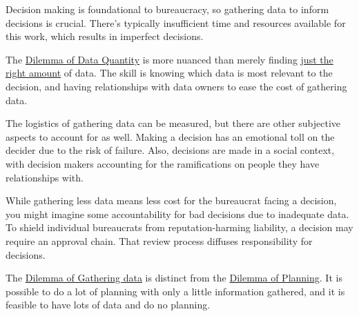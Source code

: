Decision making is foundational to bureaucracy, so gathering data to inform decisions is crucial. There's typically insufficient time and resources available for this work, which results in imperfect decisions. 

The \hyperref[table:gather-data-lots-vs-little]{Dilemma of Data Quantity} is more nuanced than merely finding 
\href{https://en.wikipedia.org/wiki/Goldilocks_principle}{just the right amount} of data.
The skill is knowing which data is most relevant to the decision, and having relationships with data owners to ease the cost of gathering data.

The logistics of gathering data can be measured, but there are other subjective aspects to account for as well. Making a decision has an emotional toll on the decider due to the risk of failure. Also, decisions are made in a social context, with decision makers accounting for the ramifications on people they have relationships with. 

While gathering less data means less cost for the bureaucrat facing a decision, you might imagine some accountability for bad decisions due to inadequate data. To shield individual bureaucrats from reputation-harming liability, a decision may require an approval chain. That review process diffuses responsibility for decisions.


The \hyperref[table:gather-data-lots-vs-little]{Dilemma of Gathering data} is distinct from the \hyperref[table:planning]{Dilemma of Planning}. It is possible to do a lot of planning with only a little information gathered, and it is feasible to have lots of data and do no planning. 

